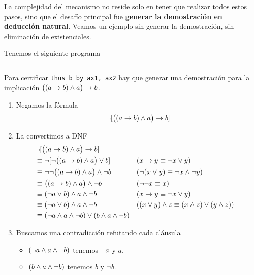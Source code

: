 La complejidad del mecanismo no reside solo en tener que realizar todos estos
pasos, sino que el desafío principal fue \textbf{generar la demostración en
deducción natural}. Veamos un ejemplo sin generar la demostración, sin
eliminación de existenciales.

\begin{ejemplo}
    Tenemos el siguiente programa

    \begin{figure}[H]
        \centering
        \begin{tabular}{c}
            
        \end{tabular}
    \end{figure}

    Para certificar \lstinline{thus b by ax1, ax2} hay que generar una
    demostración para la implicación $\big((a \to b) \wedge a \big)\to b$.

    \begin{enumerate}
        \item Negamos la fórmula 
        \[ \neg [ \big( (a \to b) \wedge a \big) \to b ] \]

        \item La convertimos a DNF
        \begin{align*}
            &\neg [ \big( (a \to b) \wedge a \big) \to b ] \\
            &\equiv \neg [ \neg \big( (a \to b) \wedge a \big) \vee b ]
                && (x \to y \equiv \neg x \vee y)\\
            &\equiv \neg \neg \big( (a \to b) \wedge a \big) \wedge \neg b
                && (\neg(x \vee y) \equiv \neg x \wedge \neg y)\\
            &\equiv \big( (a \to b) \wedge a \big) \wedge \neg b
                && (\neg\neg x \equiv x)\\
            &\equiv (\neg a \vee b) \wedge a \wedge \neg b
                 && (x \to y \equiv \neg x \vee y)\\
            &\equiv (\neg a \vee b) \wedge a \wedge \neg b
                && ((x \vee y) \wedge z \equiv (x \wedge z) \vee (y \wedge z))\\
            &\equiv
                (\neg a \wedge a \wedge \neg b)
                \vee
                (b \wedge a \wedge \neg b)
        \end{align*}

        \item Buscamos una contradicción refutando cada cláusula
        \begin{itemize}
            \item $(\neg a \wedge a \wedge \neg b)$ tenemos $\neg a$ y $a$.
            \item $(b \wedge a \wedge \neg b)$ tenemos $b$ y $\neg b$.
        \end{itemize}
    \end{enumerate}
\end{ejemplo}


